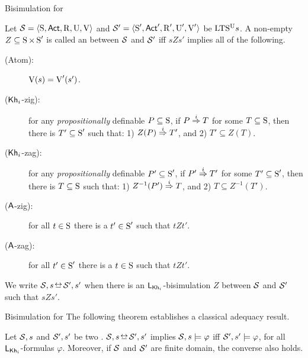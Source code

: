 \documentclass{beamer}
\begin{document}
\begin{frame}{Bisimulation for \KHilogic}
    \begin{definition}\label{def:bisim-khi}
    \begin{footnotesize}
    Let $\mathcal{S} = \langle \operatorname{S},{\rm \sf Act},\operatorname{R},\operatorname{U},\operatorname{V} \rangle$ and $\mathcal{S}' = \langle \operatorname{S}',{\rm \sf Act}',\operatorname{R}',\operatorname{U}',\operatorname{V}' \rangle$ be ${\textup{LTS$^\text{\textup{U}}$}}s$. 
    A non-empty $Z \subseteq \operatorname{S} \times \operatorname{S}'$ is called an  between $\mathcal{S}$ and $\mathcal{S}'$ iff $sZs'$ implies all of the following.
    \pause
    \begin{description} 
        \item[(Atom):] $\operatorname{V}(s)=\operatorname{V}'(s')$. \pause

        \item[(${\operatorname{\sf Kh}_i}$-zig):] for any \emph{propositionally} definable $P \subseteq \operatorname{S}$, if $P \stackrel{i}{\Rightarrow} T$ for some $T \subseteq \operatorname{S}$, then there is $T' \subseteq \operatorname{S}'$ such that: 
            1) $Z(P) \stackrel{i}{\Rightarrow} T'$, and
            2) $T' \subseteq Z(T)$.

        \item[(${\operatorname{\sf Kh}_i}$-zag):] %
        for any \emph{propositionally} definable $P' \subseteq \operatorname{S}'$, if $P' \stackrel{i}{\Rightarrow} T'$ for some $T' \subseteq \operatorname{S}'$, then there is $T \subseteq \operatorname{S}$ such that: 
            1) $Z^{-1}(P') \stackrel{i}{\Rightarrow} T$, and
            2) $T \subseteq Z^{-1}(T')$. \pause

        \item[(${\operatorname{\sf A}}$-zig):] for all $t\in\operatorname{S}$ there is a $t'\in\operatorname{S}'$ such that $tZt'$.

        \item[(${\operatorname{\sf A}}$-zag):] for all $t'\in\operatorname{S}'$ there is a $t\in\operatorname{S}$ such that $tZt'$. \pause
    \end{description}
    We write $\model,s \bisim \model',s'$ when there is an
    $\mathsf{L}_{\operatorname{\sf Kh}_i}$-bisimulation $Z$ between $\mathcal{S}$ and $\mathcal{S}'$ such that
    $sZs'$.
    \end{footnotesize}
    \end{definition}
\end{frame}


\begin{frame}{Bisimulation for \KHilogic}
The following theorem establishes a classical adequacy result. \pause

\begin{theorem}
\label{th:adequacy}
Let $\mathcal{S},s$ and $\mathcal{S}',s'$ be two \ultss. $\model,s\bisim\model',s'$ implies $\mathcal{S},s\models\varphi$ iff $\mathcal{S}',s'\models\varphi$, for all $\mathsf{L}_{\operatorname{\sf Kh}_i}$-formulas $\varphi$. Moreover, if $\mathcal{S}$ and $\mathcal{S}'$ are finite domain, the converse also holds.
\end{theorem}
\end{frame}
\end{document}
